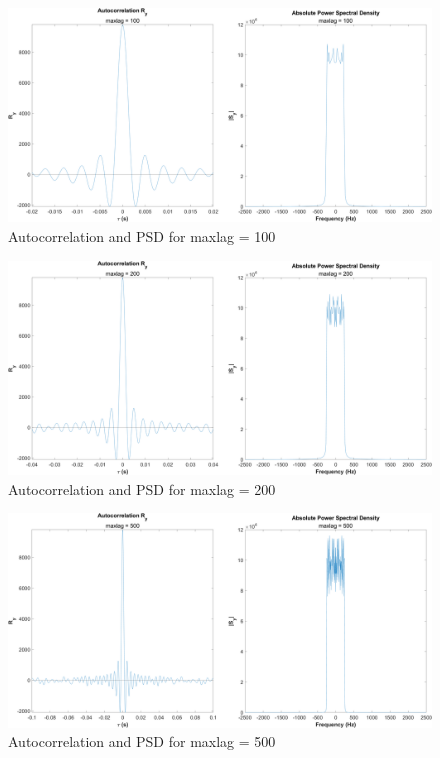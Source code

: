 \documentclass[12pt]{article}
\begin{document}
\begin{figure}[h]
	\centering
	\includegraphics[width=\textwidth]{exp1_maxlag_100}
	\caption{\label{fig:exp1_maxlag100}Autocorrelation and PSD for maxlag = 100}
\end{figure}

\begin{figure}[h]
	\centering
	\includegraphics[width=\textwidth]{exp1_maxlag_200}
	\caption{\label{fig:exp1_maxlag200}Autocorrelation and PSD for maxlag = 200}
\end{figure}

\begin{figure}[h]
	\centering
	\includegraphics[width=\textwidth]{exp1_maxlag_500}
	\caption{\label{fig:exp1_maxlag500}Autocorrelation and PSD for maxlag = 500}
\end{figure}
\end{document}
